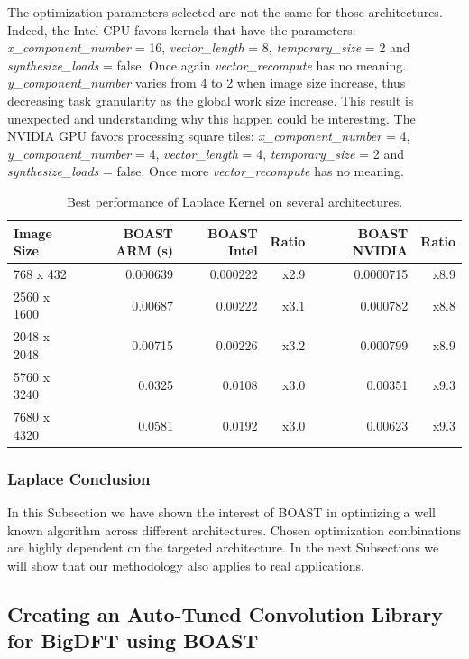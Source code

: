 \documentclass[11pt, a4paper, twoside]{montblanc}
\begin{document}
The optimization parameters selected are not the same for those architectures.
Indeed, the Intel CPU favors kernels that have the parameters:
\textit{x\_component\_number} = 16,
\textit{vector\_length} = 8,
\textit{temporary\_size} = 2 and \textit{synthesize\_loads} = false. Once again
\textit{vector\_recompute} has no meaning. \textit{y\_component\_number} varies
from 4 to 2 when image size increase, thus decreasing task granularity as the
global work size increase. This result is unexpected and understanding why this
happen could be interesting. The NVIDIA GPU favors processing square tiles:
\textit{x\_component\_number} = 4, \textit{y\_component\_number} = 4,
\textit{vector\_length} = 4, \textit{temporary\_size} = 2 and
\textit{synthesize\_loads} = false. Once more \textit{vector\_recompute} has no
meaning.

\begin{table}
\centering
\begin{tabular}{|l|r|r|r|r|r|}
\hline
Image Size & BOAST ARM (s) & BOAST Intel & Ratio & BOAST NVIDIA & Ratio \\
\hline
768 x 432   & 0.000639     & 0.000222    & x2.9  & 0.0000715    & x8.9  \\
\hline
2560 x 1600 & 0.00687      & 0.00222     & x3.1  & 0.000782     & x8.8  \\
\hline
2048 x 2048 & 0.00715      & 0.00226     & x3.2  & 0.000799     & x8.9  \\
\hline
5760 x 3240 & 0.0325       & 0.0108      & x3.0  & 0.00351      & x9.3  \\
\hline
7680 x 4320 & 0.0581       & 0.0192      & x3.0  & 0.00623      & x9.3  \\
\hline
\end{tabular}
\caption{Best performance of Laplace Kernel on several architectures.}
\label{tbl:other}
\end{table}

    \subsubsection{Laplace Conclusion}

In this Subsection we have shown the interest of BOAST in optimizing a well
known algorithm across different architectures. Chosen optimization combinations
are highly dependent on the targeted architecture. In the next Subsections we
will show that our methodology also applies to real applications.

  \subsection{Creating an Auto-Tuned Convolution Library for BigDFT using
BOAST}
\end{document}
